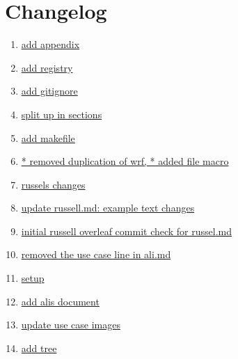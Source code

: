 \section{Changelog}
\begin{enumerate}
\itemsep0em
\item  \href{http://github.com/cyberaide/NIST-analytics/commit/84bdf19aeefb2cb43e15b6d510124ca981351df8}{add appendix}
\item  \href{http://github.com/cyberaide/NIST-analytics/commit/a782ac047775467a34b12c8cae427a353cc761e4}{add registry}
\item  \href{http://github.com/cyberaide/NIST-analytics/commit/636d0070d7ea7c46e5d9f52039f853e3ee7a5a7d}{add gitignore}
\item  \href{http://github.com/cyberaide/NIST-analytics/commit/fda44c83feff652e54e67a18fd6e0d64fdb80e47}{split up in sections}
\item  \href{http://github.com/cyberaide/NIST-analytics/commit/0112ac8a4c2bcec52a38ab693dc527bc83eaaa95}{add makefile}
\item  \href{http://github.com/cyberaide/NIST-analytics/commit/b92024d27cc06841a4206b8aec0a9443506fe004}{* removed duplication of wrf, * added file macro}
\item  \href{http://github.com/cyberaide/NIST-analytics/commit/f1f74902a13bcc8e1be1454458f7f6c41b0dc2fb}{russels changes}
\item  \href{http://github.com/cyberaide/NIST-analytics/commit/bf2124568c4cc2864f3843e466f0fd597383fdbb}{update russell.md: example text changes}
\item  \href{http://github.com/cyberaide/NIST-analytics/commit/54f25e383f833cf088af7a5dfd8bb308817d35c1}{initial russell overleaf commit check for russel.md}
\item  \href{http://github.com/cyberaide/NIST-analytics/commit/b10eca9e52c30b858ea8277eca093eed2ceba168}{removed the use case line in ali.md}
\item  \href{http://github.com/cyberaide/NIST-analytics/commit/104a00ebe48d5c0689eae9377ee1fa97ab2a411c}{setup}
\item  \href{http://github.com/cyberaide/NIST-analytics/commit/81da7f201983e042cf1e18bdce9017fd21f5e898}{add alis document}
\item  \href{http://github.com/cyberaide/NIST-analytics/commit/03e9330ff6f481a5888d3a09f01643da103a24c9}{update use case images}
\item  \href{http://github.com/cyberaide/NIST-analytics/commit/af80b245c8abe41500956fa8d5b7100a79d56cb2}{add tree}

\end{enumerate}
